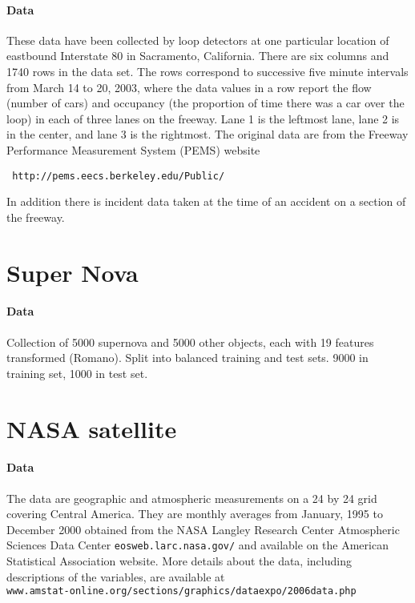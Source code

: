 \paragraph{Data}
These data have been collected by loop detectors at one particular
location of eastbound Interstate 80 in Sacramento, California.
There are six columns and 1740 rows in the data set.
The rows correspond to successive five minute intervals from March 14 to 20,
2003, 
where the data values in a row report the flow (number of cars) and occupancy
(the proportion of time there was a car over the loop) in each
of three lanes on the freeway. 
Lane 1 is the leftmost lane, lane 2 is in the center,
and lane 3 is the rightmost.
The original data are from the Freeway Performance Measurement System (PEMS)
website
\begin{verbatim}
 http://pems.eecs.berkeley.edu/Public/
\end{verbatim}

In addition there is incident data taken at the time of 
an accident on a section of the freeway.


\section{Super Nova} 

\paragraph{Data}
Collection of 5000 supernova and 5000 other objects, each with
 19 features transformed (Romano). 
Split into balanced training and test sets.  9000 in training set, 1000 in test set.

\section{NASA satellite}

\paragraph{Data} 
The data are geographic and atmospheric
measurements on a 24 by 24 grid covering Central America.
They are monthly averages from January, 1995 to December 2000 obtained 
from the NASA Langley Research Center Atmospheric Sciences Data Center
\texttt{eosweb.larc.nasa.gov/} 
and available on the American Statistical Association
website.
More details about the data, including descriptions of the variables,
are available at \\
\texttt{www.amstat-online.org/sections/graphics/dataexpo/2006data.php}

